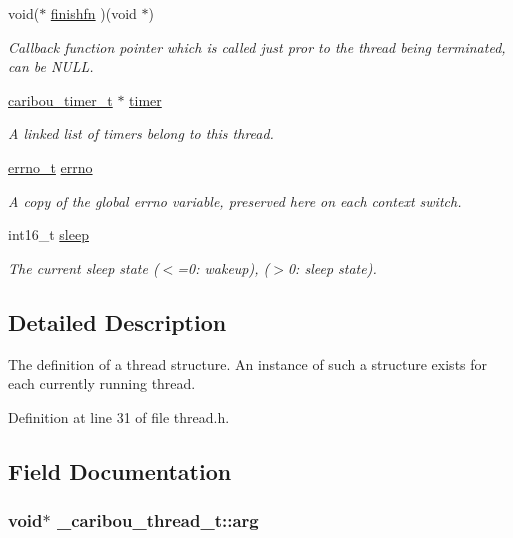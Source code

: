 \begin{DoxyCompactItemize}
void($\ast$ \hyperlink{struct__caribou__thread__t_abf99478d61f893fa11b938c562a9ef20}{finishfn} )(void $\ast$)
\begin{DoxyCompactList}\small\item\em Callback function pointer which is called just pror to the thread being terminated, can be N\-U\-L\-L. \end{DoxyCompactList}\item 
\hyperlink{timer_8h_a83310ffb8b0e689ad504298d2b80ead7}{caribou\-\_\-timer\-\_\-t} $\ast$ \hyperlink{struct__caribou__thread__t_a0b044d7f5d93f8d457ff985f0f7e4bd3}{timer}
\begin{DoxyCompactList}\small\item\em A linked list of timers belong to this thread. \end{DoxyCompactList}\item 
\hyperlink{errno_8h_a46a037236862ac1a534efbe605c10f42}{errno\-\_\-t} \hyperlink{struct__caribou__thread__t_a4a14ec3ec88fb5528f43e53686271828}{errno}
\begin{DoxyCompactList}\small\item\em A copy of the global errno variable, preserved here on each context switch. \end{DoxyCompactList}\item 
int16\-\_\-t \hyperlink{struct__caribou__thread__t_a4a4746a8fede65c362fb46c80469509f}{sleep}
\begin{DoxyCompactList}\small\item\em The current sleep state ($<$=0\-: wakeup), ($>$0\-: sleep state). \end{DoxyCompactList}\end{DoxyCompactItemize}


\subsection{Detailed Description}
The definition of a thread structure. An instance of such a structure exists for each currently running thread. 

Definition at line 31 of file thread.\-h.



\subsection{Field Documentation}
\hypertarget{struct__caribou__thread__t_a35f2bbe0ed40746c1505382dbb5cd865}{
\subsubsection[{arg}]{\setlength{\rightskip}{0pt plus 5cm}void$\ast$ \-\_\-caribou\-\_\-thread\-\_\-t\-::arg}}\label{struct__caribou__thread__t_a35f2bbe0ed40746c1505382dbb5cd865}


